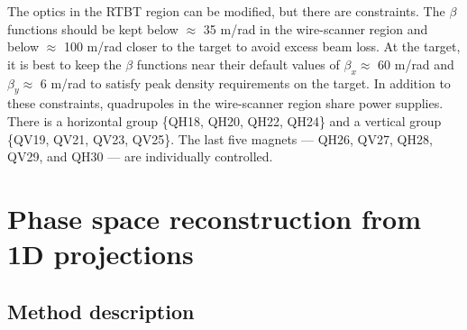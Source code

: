 The optics in the RTBT region can be modified, but there are constraints. The $\beta$ functions should be kept below $\approx$ 35 m/rad in the wire-scanner region and below $\approx$ 100 m/rad closer to the target to avoid excess beam loss. At the target, it is best to keep the $\beta$ functions near their default values of $\beta_x \approx$ 60 m/rad and $\beta_y \approx$ 6 m/rad to satisfy peak density requirements on the target. In addition to these constraints, quadrupoles in the wire-scanner region share power supplies. There is a horizontal group \{QH18, QH20, QH22, QH24\} and a vertical group \{QV19, QV21, QV23, QV25\}. The last five magnets — QH26, QV27, QH28, QV29, and QH30 — are individually controlled.


\section{Phase space reconstruction from 1D projections}

\subsection{Method description}

